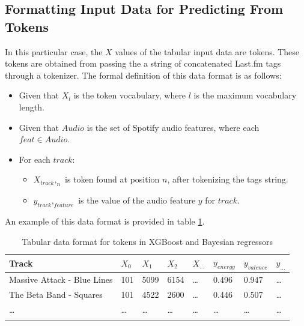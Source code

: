 \documentclass[sn-mathphys]{sn-jnl}%
\theoremstyle{thmstyleone}%
\theoremstyle{thmstyletwo}%
\theoremstyle{thmstylethree}%
\begin{document}
\subsection{Formatting Input Data for Predicting From Tokens}

In this particular case, the $X$ values of the tabular input data are tokens.
These tokens are obtained from passing the a string of concatenated Last.fm tags through a tokenizer.
The formal definition of this data format is as follows:

\begin{itemize}
      \item Given that $X_l$ is the token vocabulary, where $l$ is the maximum vocabulary length.
      \item Given that $Audio$ is the set of Spotify audio features, where each $feat \in Audio$.
      \item For each $track$:
      \begin{itemize}
            \item $X_{track},_{n}$ is token found at position $n$, after tokenizing the tags string.
            \item $y_{track},_{feature}$ is the value of the audio feature $y$ for $track$.
      \end{itemize}
\end{itemize}

An example of this data format is provided in table \ref{tabular_token_format}.

\begin{table}[h]
      \begin{center}
      \begin{minipage}{\textwidth}
      \caption{Tabular data format for tokens in XGBoost and Bayesian regressors}\label{tabular_token_format}%
      \begin{tabular}{@{}llllllll@{}}
      \toprule
      Track                         & $X_{0}$ & $X_{1}$ & $X_{2}$ & $X_{\dots}$ & $y_{energy}$ & $y_{valence}$ & $y_{\dots}$ \\
      \midrule
      Massive Attack - Blue Lines   & 101     & 5099    & 6154    &  \dots      & 0.496        & 0.947         &  \dots  \\
      The Beta Band - Squares       & 101     & 4522    & 2600    &  \dots      & 0.446        & 0.507         &  \dots  \\
      \dots                         & \dots   & \dots   & \dots   &  \dots      & \dots        & \dots         &  \dots  \\
      \botrule
      \end{tabular}
      \end{minipage}
      \end{center}
\end{table}
\end{document}
